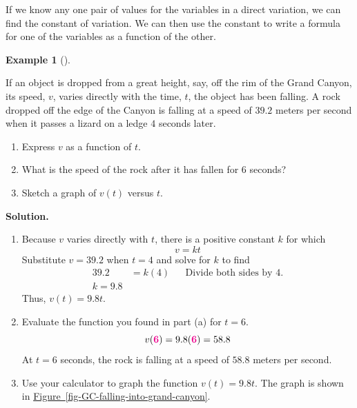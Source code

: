 \documentclass[10pt,]{book}
\theoremstyle{plain}
\theoremstyle{definition}
\theoremstyle{definition}
\theoremstyle{definition}
\newtheorem{example}[theorem]{Example}
\theoremstyle{definition}
\theoremstyle{definition}
\numberwithin{equation}{section}
\newcommand{\alert}[1]{\mathbf{\color{magenta}{#1}}}
\newcommand{\amp}{ & }
\begin{document}
	If we know any one pair of values for the variables in a direct variation, we can find the constant of variation. We can then use the constant to write a formula for one of the variables as a function of the other.
%
\begin{example}[]\label{example-falling-into-grand-canyon}

	If an object is dropped from a great height, say, off the rim of the Grand Canyon, its speed, \(v\), varies directly with the time, \(t\), the object has been falling. A rock dropped off the edge of the Canyon is falling at a speed of \(39.2\) meters per second when it passes a lizard on a ledge \(4\) seconds later.
%
\leavevmode%
\begin{enumerate}[label=*\alph**]
\item\hypertarget{li-402}{}Express \(v\) as a function of \(t\).\item\hypertarget{li-403}{}What is the speed of the rock after it has fallen for 6 seconds?\item\hypertarget{li-404}{}Sketch a graph of \(v(t)\) versus \(t\).\end{enumerate}
\par\medskip\noindent%
\textbf{Solution.}\quad \leavevmode%
\begin{enumerate}[label=*\alph**]
\item\hypertarget{li-405}{}Because \(v\) varies directly with \(t\), there is a positive constant \(k\) for which
		\begin{equation*}v = kt\end{equation*}
		Substitute \(v = 39.2\) when \(t = 4\) and solve for \(k\) to find
		\begin{align*}
		39.2 \amp = k(4)\amp\amp \text{Divide both sides by 4.}\\
		k = 9.8
		\end{align*}
		Thus, \(v (t) = 9.8 t\).\item\hypertarget{li-406}{}Evaluate the function you found in part (a) for \(t = 6\).
		\begin{equation*}v(\alert{6}) = 9.8(\alert{6}) = 58.8\end{equation*}
		At \(t = 6\) seconds, the rock is falling at a speed of \(58.8\) meters per second.\item\hypertarget{li-407}{}Use your calculator to graph the function \(v(t) = 9.8t\). The graph is shown in \hyperref[fig-GC-falling-into-grand-canyon]{Figure~\ref{fig-GC-falling-into-grand-canyon}}.
		\leavevmode%
\begin{figure}

\end{figure}
\end{enumerate}
\end{example}
\end{document}
